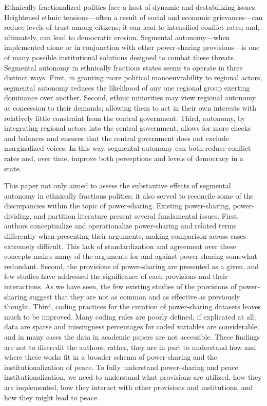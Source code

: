 \documentclass[12pt]{article}
\begin{document}
Ethnically fractionalized polities face a host of dynamic and destabilizing issues. Heightened ethnic tensions---often a result of social and economic grievances---can reduce levels of trust among citizens; it can lead to intensified conflict rates; and, ultimately, can lead to democratic erosion. Segmental autonomy---when implemented alone or in conjunction with other power-sharing provisions---is one of many possible institutional solutions designed to combat these threats. Segmental autonomy in ethnically fractious states seems to operate in three distinct ways. First, in granting more political manoeuvrability to regional actors, segmental autonomy reduces the likelihood of any one regional group exerting dominance over another. Second, ethnic minorities may view regional autonomy as concession to their demands; allowing them to act in their own interests with relatively little constraint from the central government. Third, autonomy, by integrating regional actors into the central government, allows for more checks and balances and ensures that the central government does not exclude marginalized voices. In this way, segmental autonomy can both reduce conflict rates and, over time, improve both perceptions and levels of democracy in a state.  

This paper not only aimed to assess the substantive effects of segmental autonomy in ethnically fractious polities; it also served to reconcile some of the discrepancies within the topic of power-sharing. Existing power-sharing, power-dividing, and partition literature present several fundamental issues. First, authors conceptualize and operationalize power-sharing and related terms differently when presenting their arguments, making comparison across cases extremely difficult. This lack of standardization and agreement over these concepts makes many of the arguments for and against power-sharing somewhat redundant. Second, the provisions of power-sharing are presented as a given, and few studies have addressed the significance of each provisions and their interactions. As we have seen, the few existing studies of the provisions of power-sharing suggest that they are not as common and as effective as previously thought. Third, coding practices for the curation of power-sharing datasets leaves much to be improved. Many coding rules are poorly defined, if explicated at all; data are sparse and missingness percentages for coded variables are considerable; and in many cases the data in academic papers are not accessible. These findings are not to discredit the authors, rather, they are in part to understand how and where these works fit in a broader schema of power-sharing and the institutionalization of peace. To fully understand power-sharing and peace institutionalization, we need to understand what provisions are utilized, how they are implemented, how they interact with other provisions and institutions, and how they might lead to peace.
\end{document}
